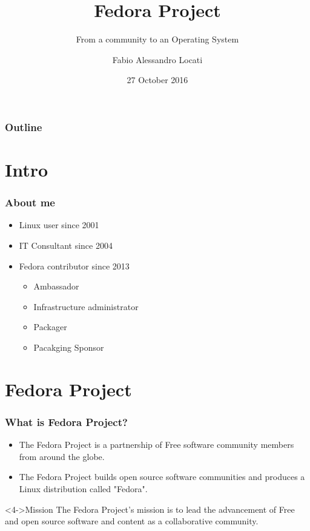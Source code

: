 \documentclass[t,aspectratio=169]{beamer}
\title{Fedora Project}
\subtitle{From a community to an Operating System}
\author{Fabio Alessandro Locati}
\date{27 October 2016}
\begin{document}
\maketitle

\begin{frame}
    \frametitle{Outline}
    \tableofcontents
\end{frame}

\section{Intro}
\begin{frame}
    \frametitle{About me} 
    \begin{itemize}
        \item<2-> Linux user since 2001
        \item<3-> IT Consultant since 2004
        \item<4-> Fedora contributor since 2013 
        \begin{itemize}
            \item<5-> Ambassador
            \item<5-> Infrastructure administrator
            \item<5-> Packager
            \item<5-> Pacakging Sponsor
        \end{itemize}
    \end{itemize}
\end{frame}

\section{Fedora Project}
\begin{frame}
    \frametitle{What is Fedora Project?}
    \begin{itemize}
        \item<2-> The Fedora Project is a partnership of Free software community members from around the globe.
        \item<3-> The Fedora Project builds open source software communities and produces a Linux distribution called "Fedora".
    \end{itemize}
    \begin{block}<4->{Mission}
        The Fedora Project's mission is to lead the advancement of Free and open source software and content as a collaborative community.
    \end{block}
\end{frame}
\end{document}

